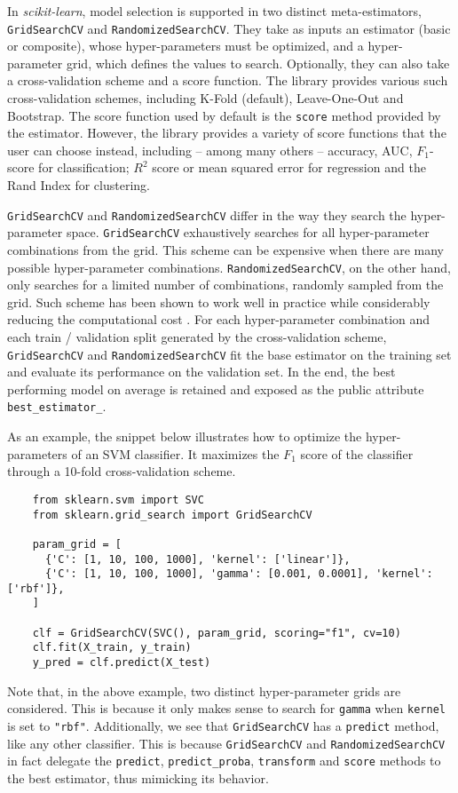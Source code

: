 \documentclass{llncs}
\newcommand{\sklearn}{\textit{scikit-learn}\xspace}
\begin{document}
In \sklearn, model selection is supported in two distinct meta-estimators,
\texttt{GridSearchCV} and \texttt{RandomizedSearchCV}.  They take as inputs an
estimator (basic or composite), whose hyper-parameters must be optimized, and a
hyper-parameter grid, which defines the values to search. Optionally, they can
also take a cross-validation scheme and a score function.  The library provides
various such cross-validation schemes, including K-Fold (default), Leave-One-Out
and Bootstrap. The score function used by default is the \texttt{score} method
provided by the estimator. However, the library provides a variety of
score functions that the user can choose instead, including -- among many others
-- accuracy, AUC, $F_1$-score for classification; $R^2$ score or mean squared
error for regression and the Rand Index for clustering.

\texttt{GridSearchCV} and \texttt{RandomizedSearchCV} differ in the way they
search the hyper-parameter space.  \texttt{GridSearchCV} exhaustively searches
for all hyper-parameter combinations from the grid. This scheme can be expensive
when there are many possible hyper-parameter combinations.
\texttt{RandomizedSearchCV}, on the other hand, only searches for a limited
number of combinations, randomly sampled from the grid. Such scheme has been
shown to work well in practice while considerably reducing the computational
cost \citep{bergstra2012}. For each hyper-parameter combination and each train /
validation split generated by the cross-validation scheme, \texttt{GridSearchCV}
and \texttt{RandomizedSearchCV} fit the base estimator on the training set and
evaluate its performance on the validation set.  In the end, the best performing
model on average is retained and exposed as the public attribute
\texttt{best\_estimator\_}.

As an example, the snippet below illustrates how to optimize the
hyper-parameters of an SVM classifier. It maximizes the $F_1$ score of the
classifier through a 10-fold cross-validation scheme.
\begin{verbatim}
    from sklearn.svm import SVC
    from sklearn.grid_search import GridSearchCV

    param_grid = [
      {'C': [1, 10, 100, 1000], 'kernel': ['linear']},
      {'C': [1, 10, 100, 1000], 'gamma': [0.001, 0.0001], 'kernel': ['rbf']},
    ]

    clf = GridSearchCV(SVC(), param_grid, scoring="f1", cv=10)
    clf.fit(X_train, y_train)
    y_pred = clf.predict(X_test)
\end{verbatim}
Note that, in the above example, two distinct hyper-parameter grids are
considered. This is because it only makes sense to search for \texttt{gamma}
when \texttt{kernel} is set to \texttt{"rbf"}.  Additionally, we see that
\texttt{GridSearchCV} has a \texttt{predict} method, like any other classifier.
This is because \texttt{GridSearchCV} and \texttt{RandomizedSearchCV} in fact
delegate the \texttt{predict}, \texttt{predict\_proba}, \texttt{transform} and
\texttt{score} methods to the best estimator, thus mimicking its behavior.
\end{document}
